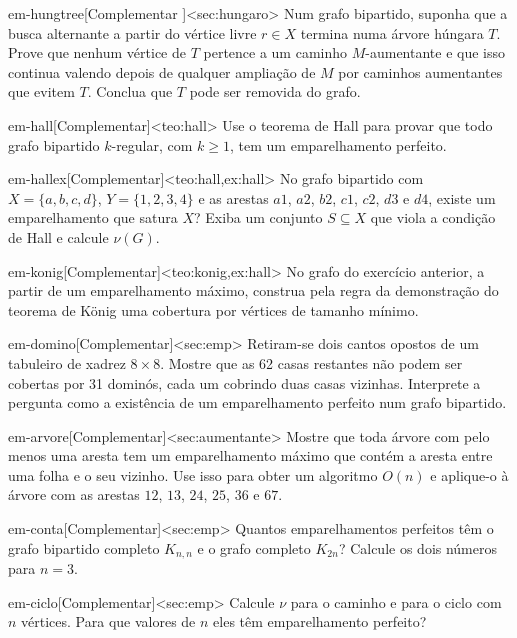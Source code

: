 \begin{exercicio}{em-hungtree}[Complementar \estrela]<sec:hungaro>
Num grafo bipartido, suponha que a busca alternante a partir do vértice livre $r\in X$ termina numa árvore húngara $T$. Prove que nenhum vértice de $T$ pertence a um caminho $M$-aumentante e que isso continua valendo depois de qualquer ampliação de $M$ por caminhos aumentantes que evitem $T$. Conclua que $T$ pode ser removida do grafo.
\end{exercicio}
\begin{exercicio}{em-hall}[Complementar]<teo:hall>
Use o teorema de Hall para provar que todo grafo bipartido $k$-regular, com $k\ge1$, tem um emparelhamento perfeito.
\end{exercicio}
\begin{exercicio}{em-hallex}[Complementar]<teo:hall,ex:hall>
No grafo bipartido com $X=\{a,b,c,d\}$, $Y=\{1,2,3,4\}$ e as arestas $a1$, $a2$, $b2$, $c1$, $c2$, $d3$ e $d4$, existe um emparelhamento que satura $X$? Exiba um conjunto $S\subseteq X$ que viola a condição de Hall e calcule $\nu(G)$.
\end{exercicio}
\begin{exercicio}{em-konig}[Complementar]<teo:konig,ex:hall>
No grafo do exercício anterior, a partir de um emparelhamento máximo, construa pela regra da demonstração do teorema de König uma cobertura por vértices de tamanho mínimo.
\end{exercicio}
\begin{exercicio}{em-domino}[Complementar]<sec:emp>
Retiram-se dois cantos opostos de um tabuleiro de xadrez $8\times8$. Mostre que as 62 casas restantes não podem ser cobertas por 31 dominós, cada um cobrindo duas casas vizinhas. Interprete a pergunta como a existência de um emparelhamento perfeito num grafo bipartido.
\end{exercicio}
\begin{exercicio}{em-arvore}[Complementar]<sec:aumentante>
Mostre que toda árvore com pelo menos uma aresta tem um emparelhamento máximo que contém a aresta entre uma folha e o seu vizinho. Use isso para obter um algoritmo $O(n)$ e aplique-o à árvore com as arestas $12$, $13$, $24$, $25$, $36$ e $67$.
\end{exercicio}
\begin{exercicio}{em-conta}[Complementar]<sec:emp>
Quantos emparelhamentos perfeitos têm o grafo bipartido completo $K_{n,n}$ e o grafo completo $K_{2n}$? Calcule os dois números para $n=3$.
\end{exercicio}
\begin{exercicio}{em-ciclo}[Complementar]<sec:emp>
Calcule $\nu$ para o caminho e para o ciclo com $n$ vértices. Para que valores de $n$ eles têm emparelhamento perfeito?
\end{exercicio}
